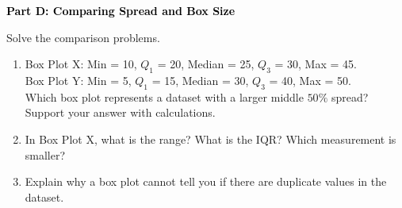 \documentclass[12pt, letterpaper, fleqn]{article}
\begin{document}
\newpage

\begin{tcolorbox}[colback=black!10]
    \large\textcolor{black}{\textbf{Part D: Comparing Spread and Box Size}}
\end{tcolorbox}

\vspace{3mm}

\noindent
Solve the comparison problems.

\vspace{5mm}

\begin{enumerate}[itemsep=2.5cm, leftmargin=0.6cm]
\item Box Plot X: Min = 10, $Q_1$ = 20, Median = 25, $Q_3$ = 30, Max = 45. \\
Box Plot Y: Min = 5, $Q_1$ = 15, Median = 30, $Q_3$ = 40, Max = 50. \\
Which box plot represents a dataset with a larger middle $50\%$ spread? Support your answer with calculations.
\vspace{1cm}

\item In Box Plot X, what is the range? What is the IQR? Which measurement is smaller?
\vspace{1.5cm}

\item Explain why a box plot cannot tell you if there are duplicate values in the dataset.
\end{enumerate}
\end{document}
